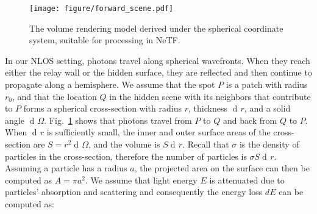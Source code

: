 \documentclass[10pt,journal,compsoc]{IEEEtran}
\DeclareMathOperator{\di}{d\!}
\begin{document}
\begin{figure}[!t]
\centering
\texttt{[image: figure/forward\_scene.pdf]}
\caption{The volume rendering model derived under the spherical coordinate system, suitable for processing in NeTF.  %
}
\label{forwardScene}
\end{figure}
 
 
 
In our NLOS setting, photons travel along spherical wavefronts. When they reach either the relay wall or the hidden surface, they are reflected and then continue to propagate along a hemisphere. We assume that the spot $P$ is a patch with radius $r_0$, and that the location $Q$ in the hidden scene with its neighbors that contribute to $P$ forms a spherical cross-section with radius $r$, thickness $\di{r}$, and a solid angle $\di{\Omega}$. Fig.~\ref{forwardScene} shows that photons travel from $P$ to $Q$ and back from $Q$ to $P$. When $\di{r}$ is sufficiently small, the inner and outer surface areas of the cross-section are $S=r^{2} \di{\Omega}$, and the volume is $S \di{r}$. Recall that $\sigma$ is the density of particles in the cross-section, therefore the number of particles is $\sigma S\di{r}$. Assuming a particle has a radius $a$, the projected area on the surface can then be computed as $A = \pi a^{2}$. We assume that light energy $E$ is attenuated due to particles' absorption and scattering and consequently the energy loss $dE$ can be computed as: 
\end{document}
